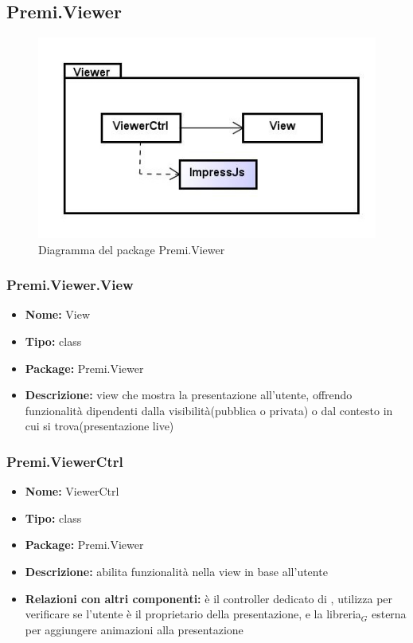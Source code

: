 \clearpage
\subsection{Premi.Viewer}
\begin{figure}[h]
\begin{center}
\includegraphics[scale=0.45]{img/diapkg/vecchi/viewer-class.jpg}
\caption{Diagramma del package Premi.Viewer}
\end{center}
\end{figure}

\subsubsection{Premi.Viewer.View}
\begin{itemize}
  \item \textbf{Nome:} View
  \item \textbf{Tipo:} class
  \item \textbf{Package:} Premi.Viewer
  \item \textbf{Descrizione:} view che mostra la presentazione all'utente, offrendo funzionalità dipendenti dalla visibilità(pubblica o privata) o dal contesto in cui si trova(presentazione live) 
\end{itemize}
\subsubsection{Premi.ViewerCtrl}
\begin{itemize}
  \item \textbf{Nome:} ViewerCtrl
  \item \textbf{Tipo:} class
  \item \textbf{Package:} Premi.Viewer
  \item \textbf{Descrizione:} abilita funzionalità nella view in base all'utente
  \item \textbf{Relazioni con altri componenti:} è il controller dedicato di , utilizza   per verificare se l'utente è il proprietario della presentazione, e la libreria$_G$ esterna  per aggiungere animazioni alla presentazione
\end{itemize}





